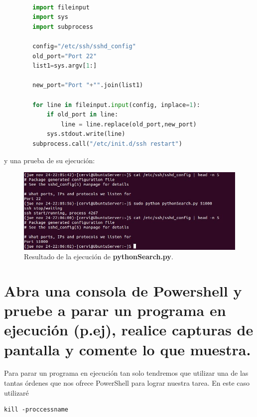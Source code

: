 \begin{lstlisting}[language=python,caption={python search}]

		import fileinput
		import sys
		import subprocess
		
		config="/etc/ssh/sshd_config"
		old_port="Port 22"
		list1=sys.argv[1:]
		
		new_port="Port "+"".join(list1)
		
		for line in fileinput.input(config, inplace=1):
		    if old_port in line:
		        line = line.replace(old_port,new_port)
		    sys.stdout.write(line)
		subprocess.call("/etc/init.d/ssh restart")

\end{lstlisting}
y una prueba de su ejecución: 
\begin{figure}[H]
	\centering
	\includegraphics[scale=0.75]{python-search.jpg}
	\caption{Resultado de la ejecución de \textbf{pythonSearch.py}. \label{fig:figura29}}
\end{figure}

\section{Abra una consola de Powershell y pruebe a parar un programa en ejecución (p.ej), realice capturas de pantalla y comente lo que muestra.}

Para parar un programa en ejecución tan solo tendremos que utilizar una de las tantas órdenes que nos ofrece PowerShell para lograr nuestra tarea. En este caso utilizaré \begin{verbatim}kill -proccessname\end{verbatim}\cite{powershell}

